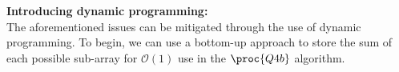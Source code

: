 




\textbf{Introducing dynamic programming:}\\
The aforementioned issues can be mitigated through the use of dynamic programming.
To begin, we can use a bottom-up approach to store the sum of each possible sub-array for $\mathcal{O}(1)$ use in the $\proc{Q4b}$ algorithm.

